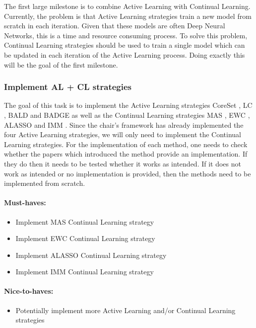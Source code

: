 \documentclass[expose, en]{thesis}
\begin{document}
The first large milestone is to combine Active Learning with Continual Learning. Currently, the
problem is that Active Learning strategies train a new model from scratch in each iteration. Given that these models
are often Deep Neural Networks, this is a time and resource consuming process. To solve this problem,
Continual Learning strategies should be used to train a single model which can be updated in each iteration
of the Active Learning process. Doing exactly this will be the goal of the first milestone.

\subsubsection{Implement AL + CL strategies} 
\label{sec:task1}
The goal of this task is to implement the Active Learning strategies CoreSet \cite{sener2017active}, LC \cite{lewis1995sequential}, BALD \cite{gal2017deep}
 and BADGE \cite{ash2019deep} as well as the Continual Learning strategies MAS \cite{aljundi2018memory},
 EWC \cite{kirkpatrick2017overcoming}, ALASSO \cite{park2019continual} and IMM \cite{lee2017overcoming}. Since the chair's framework has already implemented
 the four Active Learning strategies, we will only need to implement the Continual Learning strategies. For the
implementation of each method, one needs to check whether the papers which introduced the method provide an implementation. If they
do then it needs to be tested whether it works as intended. If it does not work as intended or no implementation
is provided, then the methods need to be implemented from scratch.
\paragraph{Must-haves:}
\begin{itemize}
    \item Implement MAS Continual Learning strategy
    \item Implement EWC Continual Learning strategy
    \item Implement ALASSO Continual Learning strategy
    \item Implement IMM Continual Learning strategy
\end{itemize}

\paragraph{Nice-to-haves:}
\begin{itemize}
    \item Potentially implement more Active Learning and/or Continual Learning strategies
\end{itemize}
\end{document}
